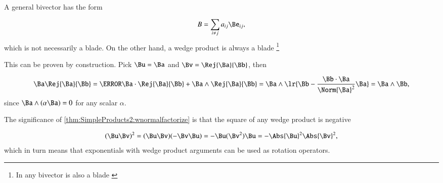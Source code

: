 %
%
A general bivector has the form

\begin{dmath}\label{eqn:normalFactorization:1800}
B = \sum_{i \ne j} a_{ij} \Be_{ij},
\end{dmath}
which is not necessarily a blade.
On the other hand, a wedge product is always a blade
\footnote{In  any bivector is also a blade \citep{ablamowicz2004lectures:chapter1}}


This can be proven by construction.
Pick \( \Bu = \Ba \) and \( \Bv = \Rej{\Ba}{\Bb} \), then

\begin{dmath}\label{eqn:normalFactorization:1840}
\Ba \Rej{\Ba}{\Bb}
=
\cancel{\Ba \cdot \Rej{\Ba}{\Bb}}
+
\Ba \wedge \Rej{\Ba}{\Bb}
=
\Ba \wedge \lr{ \Bb - \frac{\Bb \cdot \Ba}{\Norm{\Ba}^2} \Ba }
=
\Ba \wedge \Bb,
\end{dmath}
since \( \Ba \wedge (\alpha \Ba) = 0 \) for any scalar \( \alpha \).

The significance of \cref{thm:SimpleProducts2:wnormalfactorize} is that the square of any wedge product is negative

\begin{dmath}\label{eqn:normalFactorization:1820}
(\Bu \Bv)^2
=
(\Bu \Bv) (-\Bv \Bu)
=
-\Bu (\Bv^2) \Bu
=
- \Abs{\Bu}^2 \Abs{\Bv}^2,
\end{dmath}
which in turn means that exponentials with wedge product arguments can be used as rotation operators.


